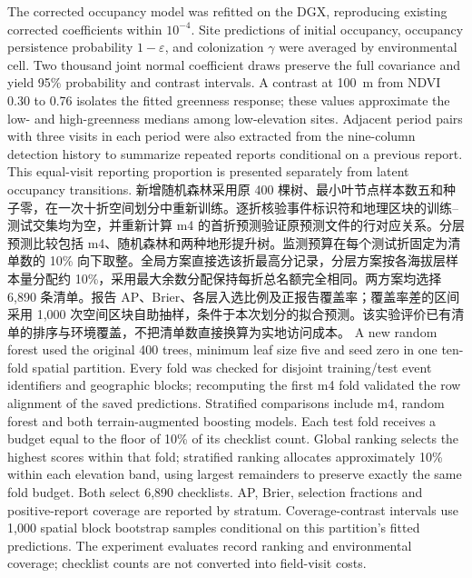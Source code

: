 \else
The corrected occupancy model was refitted on the DGX, reproducing existing corrected coefficients within $10^{-4}$. Site predictions of initial occupancy, occupancy persistence probability $1-\varepsilon$, and colonization $\gamma$ were averaged by environmental cell. Two thousand joint normal coefficient draws preserve the full covariance and yield 95\% probability and contrast intervals. A contrast at 100~m from NDVI 0.30 to 0.76 isolates the fitted greenness response; these values approximate the low- and high-greenness medians among low-elevation sites. Adjacent period pairs with three visits in each period were also extracted from the nine-column detection history to summarize repeated reports conditional on a previous report. This equal-visit reporting proportion is presented separately from latent occupancy transitions.
\fi
\ifzh
新增随机森林采用原 400 棵树、最小叶节点样本数五和种子零，在一次十折空间划分中重新训练。逐折核验事件标识符和地理区块的训练--测试交集均为空，并重新计算 m4 的首折预测验证原预测文件的行对应关系。分层预测比较包括 m4、随机森林和两种地形提升树。监测预算在每个测试折固定为清单数的 10\% 向下取整。全局方案直接选该折最高分记录，分层方案按各海拔层样本量分配约 10\%，采用最大余数分配保持每折总名额完全相同。两方案均选择 6,890 条清单。报告 AP、Brier、各层入选比例及正报告覆盖率；覆盖率差的区间采用 1,000 次空间区块自助抽样，条件于本次划分的拟合预测。该实验评价已有清单的排序与环境覆盖，不把清单数直接换算为实地访问成本。
\else
A new random forest used the original 400 trees, minimum leaf size five and seed zero in one ten-fold spatial partition. Every fold was checked for disjoint training/test event identifiers and geographic blocks; recomputing the first m4 fold validated the row alignment of the saved predictions. Stratified comparisons include m4, random forest and both terrain-augmented boosting models. Each test fold receives a budget equal to the floor of 10\% of its checklist count. Global ranking selects the highest scores within that fold; stratified ranking allocates approximately 10\% within each elevation band, using largest remainders to preserve exactly the same fold budget. Both select 6,890 checklists. AP, Brier, selection fractions and positive-report coverage are reported by stratum. Coverage-contrast intervals use 1,000 spatial block bootstrap samples conditional on this partition's fitted predictions. The experiment evaluates record ranking and environmental coverage; checklist counts are not converted into field-visit costs.
\fi
